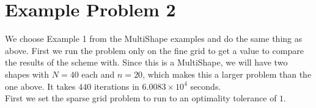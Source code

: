 \documentclass[11pt, a4paper]{article}
\theoremstyle{definition}
\begin{document}
\section{Example Problem 2}
We choose Example 1 from the MultiShape examples and do the same thing as above. 
First we run the problem only on the fine grid to get a value to compare the results of the scheme with. Since this is a MultiShape, we will have two shapes with $N = 40$ each and $n = 20$, which makes this a larger problem than the one above. It takes $440$ iterations in $6.0083 \times 10^4$ seconds.\\
First we set the sparse grid problem to run to an optimality tolerance of $1$.
	
	
	
	
	
\end{document}
